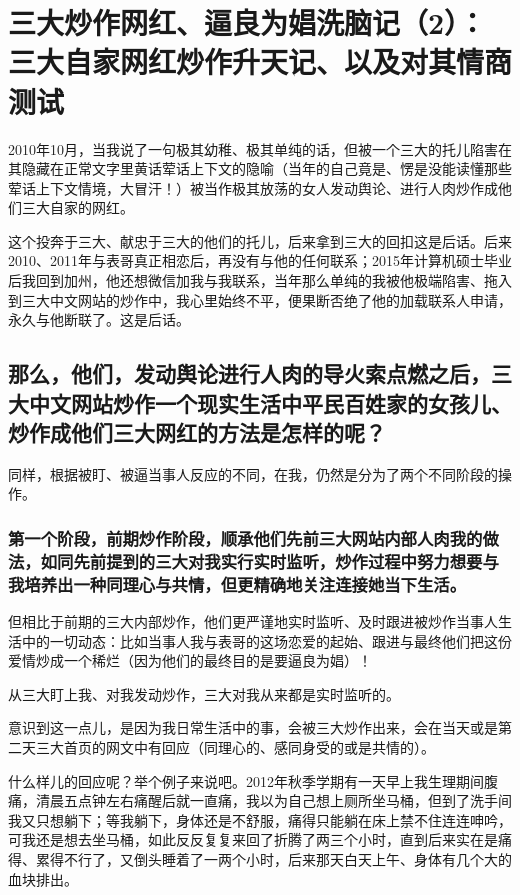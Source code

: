 \documentclass[9pt, b5paper]{article}
\begin{document}
\section{三大炒作网红、逼良为娼洗脑记（2）：三大自家网红炒作升天记、以及对其情商测试}
\label{sec:org9190613}

2010年10月，当我说了一句极其幼稚、极其单纯的话，但被一个三大的托儿陷害在其隐藏在正常文字里黄话荤话上下文的隐喻（当年的自己竟是、愣是没能读懂那些荤话上下文情境，大冒汗！）被当作极其放荡的女人发动舆论、进行人肉炒作成他们三大自家的网红。

这个投奔于三大、献忠于三大的他们的托儿，后来拿到三大的回扣这是后话。后来2010、2011年与表哥真正相恋后，再没有与他的任何联系；2015年计算机硕士毕业后我回到加州，他还想微信加我与我联系，当年那么单纯的我被他极端陷害、拖入到三大中文网站的炒作中，我心里始终不平，便果断否绝了他的加载联系人申请，永久与他断联了。这是后话。 

\subsection{那么，他们，发动舆论进行人肉的导火索点燃之后，三大中文网站炒作一个现实生活中平民百姓家的女孩儿、炒作成他们三大网红的方法是怎样的呢？}
\label{sec:org353f86d}

同样，根据被盯、被逼当事人反应的不同，在我，仍然是分为了两个不同阶段的操作。

\subsubsection{第一个阶段，前期炒作阶段，顺承他们先前三大网站内部人肉我的做法，如同先前提到的三大对我实行实时监听，炒作过程中努力想要与我培养出一种同理心与共情，但更精确地关注连接她当下生活。}
\label{sec:org9da6f5b}

但相比于前期的三大内部炒作，他们更严谨地实时监听、及时跟进被炒作当事人生活中的一切动态：比如当事人我与表哥的这场恋爱的起始、跟进与最终他们把这份爱情炒成一个稀烂（因为他们的最终目的是要逼良为娼）！

从三大盯上我、对我发动炒作，三大对我从来都是实时监听的。

意识到这一点儿，是因为我日常生活中的事，会被三大炒作出来，会在当天或是第二天三大首页的网文中有回应（同理心的、感同身受的或是共情的）。

什么样儿的回应呢？举个例子来说吧。2012年秋季学期有一天早上我生理期间腹痛，清晨五点钟左右痛醒后就一直痛，我以为自己想上厕所坐马桶，但到了洗手间我又只想躺下；等我躺下，身体还是不舒服，痛得只能躺在床上禁不住连连呻吟，可我还是想去坐马桶，如此反反复复来回了折腾了两三个小时，直到后来实在是痛得、累得不行了，又倒头睡着了一两个小时，后来那天白天上午、身体有几个大的血块排出。
\end{document}
